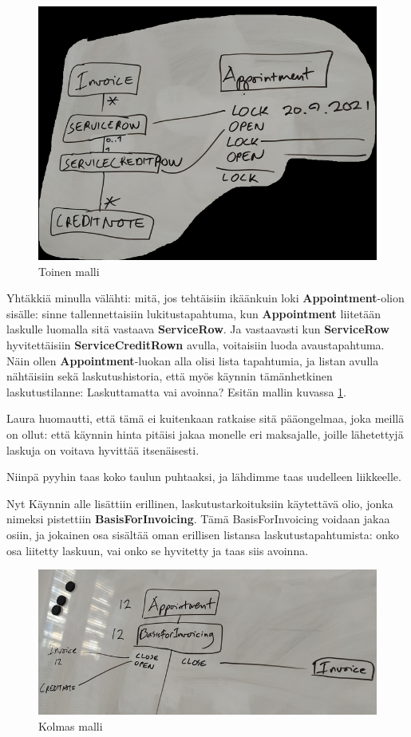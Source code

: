 \begin{figure}
\centering
\includegraphics{illustration/malli2.jpg}
\caption{\label{diarymalli2}Toinen malli}
\end{figure}

Yhtäkkiä minulla välähti: mitä, jos tehtäisiin ikäänkuin loki
\textbf{Appointment}-olion sisälle: sinne tallennettaisiin
lukitustapahtuma, kun \textbf{Appointment} liitetään laskulle luomalla
sitä vastaava \textbf{ServiceRow}. Ja vastaavasti kun
\textbf{ServiceRow} hyvitettäisiin \textbf{ServiceCreditRown} avulla,
voitaisiin luoda avaustapahtuma. Näin ollen \textbf{Appointment}-luokan
alla olisi lista tapahtumia, ja listan avulla nähtäisiin sekä
laskutushistoria, että myös käynnin tämänhetkinen laskutustilanne:
Laskuttamatta vai avoinna? Esitän mallin kuvassa \ref{diarymalli2}.

Laura huomautti, että tämä ei kuitenkaan ratkaise sitä pääongelmaa, joka
meillä on ollut: että käynnin hinta pitäisi jakaa monelle eri
maksajalle, joille lähetettyjä laskuja on voitava hyvittää itsenäisesti.

Niinpä pyyhin taas koko taulun puhtaaksi, ja lähdimme taas uudelleen
liikkeelle.

Nyt Käynnin alle lisättiin erillinen, laskutustarkoituksiin käytettävä
olio, jonka nimeksi pistettiin \textbf{BasisForInvoicing}. Tämä
BasisForInvoicing voidaan jakaa osiin, ja jokainen osa sisältää oman
erillisen listansa laskutustapahtumista: onko osa liitetty laskuun, vai
onko se hyvitetty ja taas siis avoinna.

\begin{figure}
\centering
\includegraphics{illustration/malli3.jpg}
\caption{\label{diarymalli3}Kolmas malli}
\end{figure}

